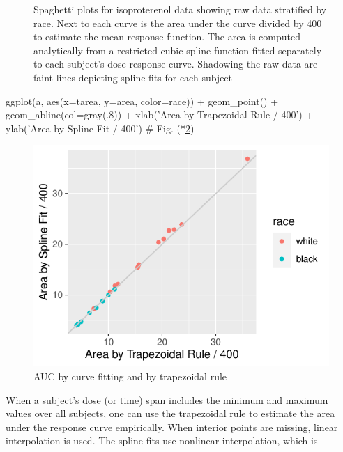 \begin{Schunk}
\begin{figure}[htbp]
\caption[Spaghetti plots for isoproterenol data]{Spaghetti plots for isoproterenol data showing raw data stratified by race.  Next to each curve is the area under the curve divided by 400 to estimate the mean response function.  The area is computed analytically from a restricted cubic spline function fitted separately to each subject's dose-response curve.  Shadowing the raw data are faint lines depicting spline fits for each subject}\label{fig:serial-spag}
\end{figure}
\end{Schunk}

\begin{Schunk}
\begin{Sinput}
ggplot(a, aes(x=tarea, y=area, color=race)) + geom_point() +
  geom_abline(col=gray(.8)) +
  xlab('Area by Trapezoidal Rule / 400') +
  ylab('Area by Spline Fit / 400')          # Fig. (*\ref{fig:serial-auctwo}\ipacue*)
\end{Sinput}
\begin{figure}[htbp]

\centerline{\includegraphics[width=\maxwidth]{serial-auctwo-1} }

\caption[AUC by curve fitting and by trapezoidal rule]{AUC by curve fitting and by trapezoidal rule}\label{fig:serial-auctwo}
\end{figure}
\end{Schunk}
When a subject's dose (or time) span includes the minimum and maximum values
over all subjects, one can use the trapezoidal rule to estimate the area under
the response curve empirically.  When interior points are missing, linear
interpolation is used.  The spline fits use nonlinear interpolation, which is
